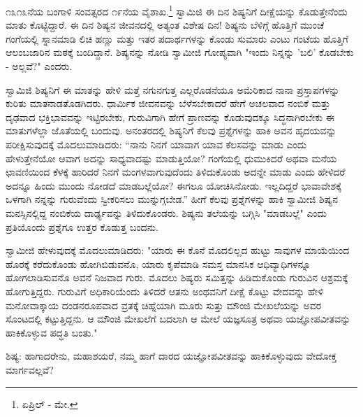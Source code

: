 ೧೩೧೩ನೆಯ ಬಂಗಾಳಿ ಸಂವತ್ಸರದ ೧೯ನೆಯ ವೈಶಾಖ.\footnote{ಏಪ್ರಿಲ್ - ಮೇ.} ಸ್ವಾಮಿಜಿ ಈ ದಿನ ಶಿಷ್ಯನಿಗೆ ದೀಕ್ಷೆಯನ್ನು ಕೊಡುತ್ತೇನೆಂದು ಮಾತು ಕೊಟ್ಟಿದ್ದಾರೆ. ಈ ದಿನ ಶಿಷ್ಯನ ಜೀವನದಲ್ಲಿ ಅತ್ಯಂತ ವಿಶೇಷ ದಿನ! ಶಿಷ್ಯನು ಬೆಳಿಗ್ಗೆ ಹೊತ್ತಿಗೆ ಮುಂಚೆ ಗಂಗೆಯಲ್ಲಿ ಸ್ನಾನಮಾಡಿ ಲಿಚಿ ಹಣ್ಣು ಮತ್ತು ಇತರ ಪದಾರ್ಥಗಳನ್ನು ಕೊಂಡು ಸುಮಾರು ಎಂಟು ಗಂಟೆಯ ಹೊತ್ತಿಗೆ ಆಲಂಬಜಾರಿನ ಮಠಕ್ಕೆ ಬಂದಿದ್ದಾನೆ. ಶಿಷ್ಯನನ್ನು ನೋಡಿ ಸ್ವಾಮೀಜಿ ಗೋಪ್ಯವಾಗಿ "ಇಂದು ನಿನ್ನನ್ನು 'ಬಲಿ' ಕೊಡಬೇಕು - ಅಲ್ಲವೆ?" ಎಂದರು.

ಸ್ವಾಮಿಜಿ ಶಿಷ್ಯನಿಗೆ ಈ ಮಾತನ್ನು ಹೇಳಿ ಮತ್ತೆ ನಗುನಗುತ್ತ ಎಲ್ಲರೊಡನೆಯೂ ಅಮೆರಿಕಾದ ನಾನಾ ಪ್ರಸ್ತಾಪಗಳನ್ನು ಕುರಿತು ಮಾತನಾಡತೊಡಗಿದರು. ಧಾರ್ಮಿಕ ಜೀವನವನ್ನು ಬೆಳೆಸಬೇಕಾದರೆ ಹೇಗೆ ಅಚಲವಾದ ನಂಬಿಕೆ ಮತ್ತು ದೃಢವಾದ ಭಕ್ತಿಭಾವವನ್ನು ಇಟ್ಟಿರಬೇಕು, ಗುರುವಿಗಾಗಿ ಹೇಗೆ ಪ್ರಾಣವನ್ನು ಕೊಡುವುದಕ್ಕೂ ಸಿದ್ಧನಾಗಿರಬೇಕು ಈ ಮಾತುಗಳೆಲ್ಲಾ ಜೊತೆಯಲ್ಲಿ ಬಂದುವು. ಅನಂತರದಲ್ಲಿ ಶಿಷ್ಯನಿಗೆ ಕೆಲವು ಪ್ರಶ್ನೆಗಳನ್ನು ಹಾಕಿ ಅವನ ಹೃದಯವನ್ನು ಪರೀಕ್ಷಿಸುವುದಕ್ಕೆ ಮೊದಲುಮಾಡಿದರು: “ನಾನು ನಿನಗೆ ಯಾವಾಗ ಯಾವ ಕೆಲಸವನ್ನು ಮಾಡು ಎಂದು ಹೇಳುತ್ತೇನೆಯೋ ಆವಾಗ ಅದನ್ನು ಸಾಧ್ಯವಾದಷ್ಟು ಮಾಡುತ್ತಿಯೋ? ಗಂಗೆಯಲ್ಲಿ ಧುಮುಕಿದರೆ ಅಥವಾ ಮನೆಯ ಛಾವಣಿಯಿಂದ ಕೆಳಕ್ಕೆ ಹಾರಿದರೆ ನಿನಗೆ ಮಂಗಳವಾಗುವುದೆಂದು ತಿಳಿದುಕೊಂಡು ಅದನ್ನೇ ಮಾಡು ಎಂದು ಹೇಳಿದರೆ ಅದನ್ನೂ ಹಿಂದು ಮುಂದು ನೋಡದೆ ಮಾಡಬಲ್ಲೆಯೋ? ಈಗಲೂ ಯೋಚಿಸಿನೋಡು. ಇಲ್ಲದಿದ್ದರೆ ಭಾವಾವೇಶಕ್ಕೆ ಒಳಗಾಗಿ ನನ್ನನ್ನು ಗುರುವೆಂದು ಸ್ವೀಕರಿಸಲು ಮುನ್ನುಗ್ಗಬೇಡ.” ಹೀಗೆ ಕೆಲವು ಪ್ರಶ್ನೆಗಳನ್ನು ಹಾಕಿ ಸ್ವಾಮೀಜಿ ಶಿಷ್ಯನ ಮನಸ್ಸಿನಲ್ಲಿದ್ದ ನಂಬಿಕೆಯ ದಾರ್ಢ್ಯವನ್ನು ತಿಳಿದುಕೊಂಡರು. ಶಿಷ್ಯನು ತಲೆಯನ್ನು ಬಗ್ಗಿಸಿ "ಮಾಡಬಲ್ಲೆ" ಎಂದು ಪ್ರತಿಯೊಂದು ಪ್ರಶ್ನೆಗೂ ಉತ್ತರ ಕೊಡುತ್ತ ಬಂದನು.

ಸ್ವಾಮೀಜಿ ಹೇಳುವುದಕ್ಕೆ ಮೊದಲುಮಾಡಿದರು: "ಯಾರು ಈ ಕೊನೆ ಮೊದಲಿಲ್ಲದ ಹುಟ್ಟು ಸಾವುಗಳ ಮಾಯೆಯಿಂದ ಹೊರಕ್ಕೆ ಕರೆದುಕೊಂಡು ಹೋಗಿಬಿಡುವನೊ, ಯಾರು ಕೃಪೆಮಾಡಿ ಸಮಸ್ತ ಮಾನಸಿಕ ಆಧಿವ್ಯಾಧಿಗಳನ್ನೂ ಹೋಗಲಾಡಿಸುವನೊ ಅವನೆ ನಿಜವಾದ ಗುರು. ಮೊದಲು ಶಿಷ್ಯರು ಸಮಿತ್ತನ್ನು ಹಿಡಿದುಕೊಂಡು ಗುರುವಿನ ಆಶ್ರಮಕ್ಕೆ ಹೋಗುತ್ತಿದ್ದರು. ಗುರುವಿಗೆ ಅಧಿಕಾರಿಯೆಂದು ತಿಳಿದರೆ ಆತನು ಅಂಥವನಿಗೆ ದೀಕ್ಷೆ ಕೊಟ್ಟು ವೇದವನ್ನು ಹೇಳಿ ಮನೋವಾಕ್ಕಾಯ ದಂಡನರೂಪವಾದ ವ್ರತಕ್ಕೆ ಚಿಹ್ನೆಯಾಗಿ ಮೂರು ಸುತ್ತು ಮೌಂಜಿ ಮೇಖಲೆಯನ್ನು ಅವರ ಸೊಂಟದಲ್ಲಿ ಕಟ್ಟುತ್ತಿದ್ದನು. ಆ ಮೌಂಜಿ ಮೇಖಲೆಗೆ ಬದಲಾಗಿ ಆ ಮೇಲೆ ಯಜ್ಞಸೂತ್ರ ಅಥವಾ ಯಜ್ಞೋಪವೀತವನ್ನು ಹಾಕಿಕೊಳ್ಳುವ ಪದ್ಧತಿ ಬಂತು."

ಶಿಷ್ಯ: ಹಾಗಾದರೇನು, ಮಹಾಶಯರೆ, ನಮ್ಮ ಹಾಗೆ ದಾರದ ಯಜ್ಞೋಪವೀತವನ್ನು ಹಾಕಿಕೊಳ್ಳುವುದು ವೇದೋಕ್ತ ಮಾರ್ಗವಲ್ಲವೆ?

